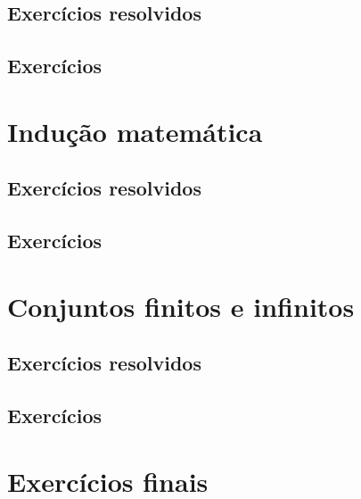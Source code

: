 \construirSec

\subsection*{Exercícios resolvidos}

\construirExeresol

\subsection*{Exercícios}

\construirExer

\section{Indução matemática}\label{sec:inducao_matematica}

\construirSec

\subsection*{Exercícios resolvidos}

\construirExeresol

\subsection*{Exercícios}

\construirExer

\section{Conjuntos finitos e infinitos}\label{sec:conjuntos_finitos_e_infinitos}

\construirSec

\subsection*{Exercícios resolvidos}

\construirExeresol

\subsection*{Exercícios}

\construirExer

\section{Exercícios finais}

\construirExer



